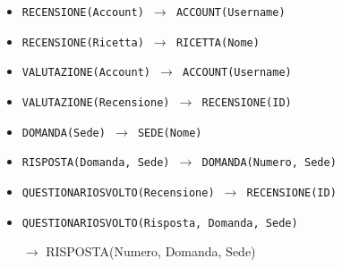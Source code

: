 \begin{itemize}[parsep=0pt,listparindent=9\parindent]
    \item\tt RECENSIONE(Account) $\rightarrow$ ACCOUNT(Username)
    \item\tt RECENSIONE(Ricetta) $\rightarrow$ RICETTA(Nome)
    \item\tt VALUTAZIONE(Account) $\rightarrow$ ACCOUNT(Username)
    \item\tt VALUTAZIONE(Recensione) $\rightarrow$ RECENSIONE(ID)
    \item\tt DOMANDA(Sede) $\rightarrow$ SEDE(Nome)
    \item\tt RISPOSTA(Domanda, Sede) $\rightarrow$ DOMANDA(Numero, Sede)
    \item\tt QUESTIONARIOSVOLTO(Recensione) $\rightarrow$ RECENSIONE(ID)
    \item\tt QUESTIONARIOSVOLTO(Risposta, Domanda, Sede)
    
        $\rightarrow$ RISPOSTA(Numero, Domanda, Sede)
\end{itemize}
